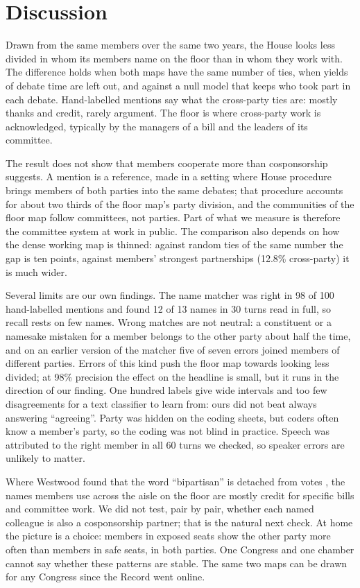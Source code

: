 
\section*{Discussion}

Drawn from the same members over the same two years, the House looks less divided in whom its members name on the
floor than in whom they work with. The difference holds when both maps have the same number of ties, when yields
of debate time are left out, and against a null model that keeps who took part in each debate. Hand-labelled
mentions say what the cross-party ties are: mostly thanks and credit, rarely argument. The floor is where
cross-party work is acknowledged, typically by the managers of a bill and the leaders of its committee.

The result does not show that members cooperate more than cosponsorship suggests. A mention is a reference, made
in a setting where House procedure brings members of both parties into the same debates; that procedure accounts
for about two thirds of the floor map's party division, and the communities of the floor map follow committees,
not parties. Part of what we measure is therefore the committee system at work in public. The comparison also
depends on how the dense working map is thinned: against random ties of the same number the gap is ten points,
against members' strongest partnerships (12.8\% cross-party) it is much wider.

Several limits are our own findings. The name matcher was right in 98 of 100 hand-labelled mentions and found 12
of 13 names in 30 turns read in full, so recall rests on few names. Wrong matches are not neutral: a constituent or a
namesake mistaken for a member belongs to the other party about half the time, and on an earlier version of the
matcher five of seven errors joined members of different parties. Errors of this kind push the floor map towards
looking less divided; at 98\% precision the effect on the headline is small, but it runs in the direction of our
finding. One hundred labels give wide intervals and too few
disagreements for a text classifier to learn from: ours did not beat always answering ``agreeing''. Party was hidden on the
coding sheets, but coders often know a member's party, so the coding was not blind in practice. Speech was
attributed to the right member in all 60 turns we checked, so speaker errors are unlikely to matter.

Where Westwood found that the word ``bipartisan'' is detached from votes \cite{westwood2022}, the names members use
across the aisle on the floor are mostly credit for specific bills and committee work. We did not test, pair by
pair, whether each named colleague is also a cosponsorship partner; that is the natural next check. At home the picture is a choice: members in exposed seats show
the other party more often than members in safe seats, in both parties. One Congress and one chamber cannot say
whether these patterns are stable. The same two maps can be drawn for any Congress since the Record went online.
